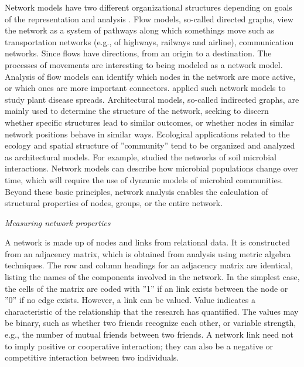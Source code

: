 Network models have two different organizational structures depending on goals of the representation and analysis . Flow models, so-called directed graphs, view the network as a system of pathways along which somethings move such as transportation networks (e.g., of highways, railways and airline), communication networks. Since flows have directions, from an origin to a destination. The processes of movements  are interesting to being modeled as a network model. Analysis of flow models can identify which nodes in the network are more active, or which ones are more important connectors.  applied such network models to study plant disease spreads. Architectural models, so-called indirected graphs, are mainly used to determine the structure of the network, seeking to discern whether specific structures lead to similar outcomes, or whether nodes in similar network positions behave in similar ways. Ecological applications related to the ecology and spatial structure of ''community'' tend to be organized and analyzed as architectural models. For example,  studied the networks of soil microbial interactions. Network models can describe how microbial populations change over time, which will require the use of dynamic models of microbial communities. Beyond these basic principles, network analysis enables the calculation of structural properties of nodes, groups, or the entire network.

\textit{Measuring network properties}

A network is made up of nodes and links from relational data. It is constructed from an adjacency matrix, which is obtained from analysis using metric algebra techniques. The row and column headings for an adjacency matrix are identical, listing the names of the components involved in the network. In the simplest case, the cells of the matrix are coded with ''1'' if an link exists between the node or ''0'' if no edge exists. However, a link can be valued. Value indicates a characteristic of the relationship that the research has quantified. The values may be binary, such as whether two friends recognize each other, or variable strength, e.g., the number of mutual friends between two friends. A network link need not to imply positive or cooperative interaction; they can also be a negative or competitive interaction between two individuals.    

